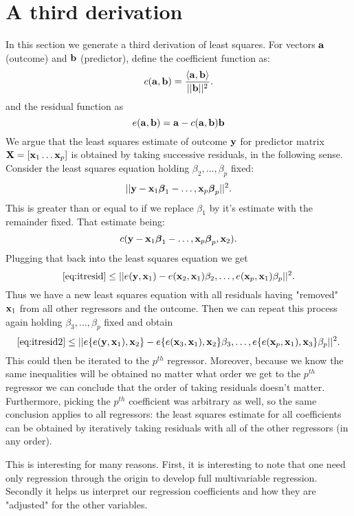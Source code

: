 \section{A third derivation}
In this section we generate a third derivation
of least squares. 
For vectors $\mathbf{a}$ (outcome) and $\mathbf{b}$ (predictor), define the coefficient function as:
$$
c(\mathbf{a}, \mathbf{b})
= \frac{\langle \mathbf{a}, \mathbf{b} \rangle}{|| \mathbf{b} ||^2}.
$$
and the residual function as
$$
e(\mathbf{a}, \mathbf{b}) = \mathbf{a} - c(\mathbf{a}, \mathbf{b}) \mathbf{b}
$$
We argue that the least squares estimate of outcome
$\mathbf{y}$ for predictor matrix $\mathbf{X} = [\mathbf{x}_1 \ldots \mathbf{x}_p]$
is obtained by taking successive residuals, in the following sense. Consider the least squares
equation holding $\beta_2, \ldots, \beta_p$ fixed:
\begin{equation}
\label{eq:itresid}
|| \mathbf{y} - \mathbf{x}_1 \boldsymbol{\beta}_1 - \ldots, \mathbf{x}_p \boldsymbol{\beta}_p||^2.
\end{equation}
This is greater than or equal to
if we replace $\beta_1$ by it's
estimate with the remainder fixed. That estimate
being:
$$
c(\mathbf{y} - \mathbf{x}_1 \boldsymbol{\beta}_1 - \ldots, \mathbf{x}_p \boldsymbol{\beta}_p, \mathbf{x}_2).
$$
Plugging that back into the least squares equation we
get
\begin{equation}
\label{eq:itresid2}
\eqref{eq:itresid}\leq ||e(\mathbf{y}, \mathbf{x}_1) - 
e(\mathbf{x}_2, \mathbf{x}_1) \beta_2, \ldots, e(\mathbf{x}_p, \mathbf{x}_1) \beta_p||^2.
\end{equation}
Thus we have a new least squares equation with 
all residuals having "removed" $\mathbf{x}_1$ from all other
regressors and the outcome. Then we can repeat this
process again holding $\beta_3, \ldots, \beta_p$
fixed and obtain
$$
\eqref{eq:itresid2}\leq ||e\{e(\mathbf{y}, \mathbf{x}_1), \mathbf{x}_2\} - 
e\{e(\mathbf{x}_3, \mathbf{x}_1), \mathbf{x}_2\} \beta_3, \ldots, e\{e(\mathbf{x}_p, \mathbf{x}_1), \mathbf{x}_3\} \beta_p||^2.
$$
This could then be iterated to the $p^{th}$ regressor.
Moreover, because we know the same inequalities will be
obtained no matter what order we get to the $p^{th}$
regressor we can conclude that the order of taking
residuals doesn't matter. Furthermore, picking the
$p^{th}$ coefficient was arbitrary as well, so the
same conclusion applies to all regressors: the
least squares estimate for all coefficients can be
obtained by iteratively taking residuals with all of the
other regressors (in any order). 

This is interesting for many reasons. First, it
is interesting to note that one need only 
regression through the origin to develop full
multivariable regression. Secondly it helps
us interpret our regression coefficients and
how they are "adjusted" for the other variables.

